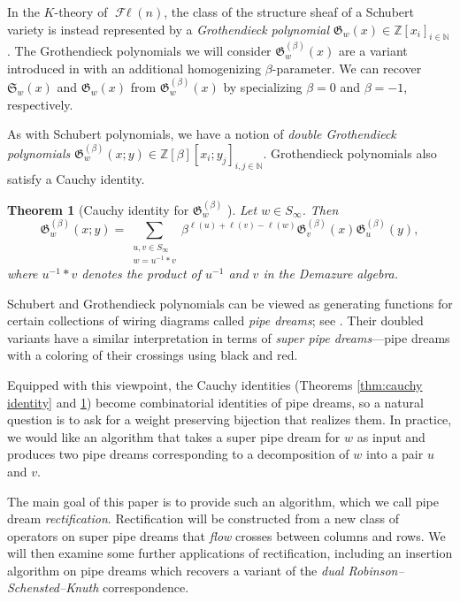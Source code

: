 \documentclass[11pt,reqno]{amsart} %
\newcommand{\bbN}{\mathbb{N}}
\newcommand{\bbZ}{\mathbb{Z}}
\newcommand{\frakS}{\mathfrak{S}}
\newcommand{\frakG}{\mathfrak{G}}
\DeclareMathOperator{\Fl}{\mathcal{F}\ell}
\newtheorem{theorem}{Theorem}[section]
\theoremstyle{definition}
\begin{document}
In the $K$-theory of $\Fl(n)$, the class of the structure sheaf of a Schubert variety is instead represented by a \textit{Grothendieck polynomial} $\frakG_w(x)\in \bbZ[x_i]_{i\in\bbN}$ \cite{LascouxSchutzenberger82b,LascouxSchutzenberger83}.
The Grothendieck polynomials we will consider $\frakG_w^{(\beta)}(x)$ are a variant introduced in \cite{FominKirillov94} with an additional homogenizing $\beta$-parameter.
We can recover $\frakS_w(x)$ and $\frakG_w(x)$ from $\frakG_w^{(\beta)}(x)$ by specializing $\beta = 0$ and $\beta = -1$, respectively.

As with Schubert polynomials, we have a notion of \textit{double Grothendieck polynomials} $\frakG_w^{(\beta)}(x;y) \in \bbZ[\beta][x_i;y_j]_{i,j\in\bbN}$.
Grothendieck polynomials also satisfy a Cauchy identity.

\begin{theorem}[Cauchy identity for $\frakG_w^{(\beta)}$ \cite{FominKirillov94}]
\label{thm:K-cauchy identity}
Let $w\in S_\infty$.
Then \[
    \frakG_w^{(\beta)}(x;y) =
    \sum_{\substack{u,v\in S_\infty \\ w = u^{-1}*v}} 
    \beta^{\ell(u)+\ell(v)-\ell(w)}\frakG_v^{(\beta)}(x)\frakG_u^{(\beta)}(y),
\]
where $u^{-1}*v$ denotes the product of $u^{-1}$ and $v$ in the Demazure algebra.
\end{theorem}

Schubert and Grothendieck polynomials can be viewed as generating functions for certain collections of wiring diagrams called \emph{pipe dreams}; see \cite{BergeronBilley93,FominKirillov96,FominKirillov94,KnutsonMiller05}.
Their doubled variants have a similar interpretation in terms of \textit{super pipe dreams}---pipe dreams with a coloring of their crossings using black and red.

Equipped with this viewpoint, the Cauchy identities (Theorems \ref{thm:cauchy identity} and \ref{thm:K-cauchy identity}) become combinatorial identities of pipe dreams, so a natural question is to ask for a weight preserving bijection that realizes them.
In practice, we would like an algorithm that takes a super pipe dream for $w$ as input and produces two pipe dreams corresponding to a decomposition of $w$ into a pair $u$ and $v$.

The main goal of this paper is to provide such an algorithm, which we call pipe dream \textit{rectification}.
Rectification will be constructed from a new class of operators on super pipe dreams that \textit{flow} crosses between columns and rows.
We will then examine some further applications of rectification, including an insertion algorithm on pipe dreams which recovers a variant of the \textit{dual Robinson--Schensted--Knuth} correspondence.
\end{document}
